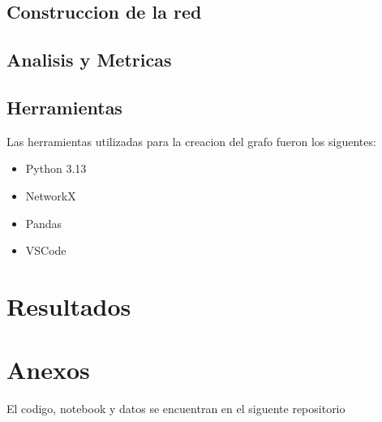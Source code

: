 \documentclass[twocolumn]{article}
\begin{document}
\subsection{Construccion de la red}
\blindtext[1]

\subsection{Analisis y Metricas}
\blindtext[1]

\subsection{Herramientas}
Las herramientas utilizadas para la creacion del grafo fueron los siguentes:
\begin{itemize}
    \item Python 3.13
    \item NetworkX
    \item Pandas
    \item VSCode
\end{itemize}

\section{Resultados}
\blindtext[4]

\printbibliography

\section{Anexos}
El codigo, notebook y datos se encuentran en el siguente repositorio \parencite{repoCodigo}
\end{document}
